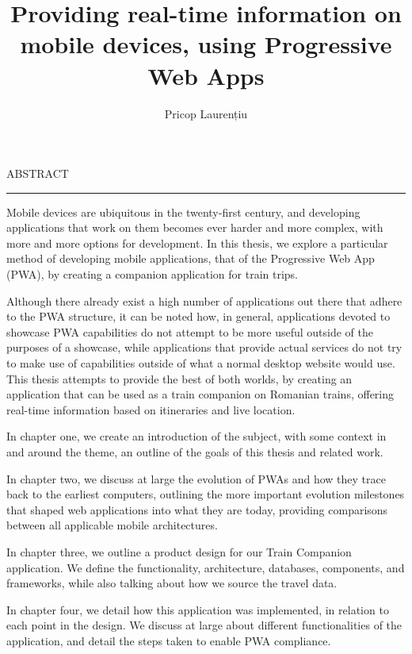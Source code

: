 \documentclass[12pt]{report}
\begin{document}
\title{Providing real-time information on mobile devices, using Progressive Web Apps}
\author{Pricop Laurențiu}

\maketitle

\newpage
\thispagestyle{empty}
\mbox{}
\newpage
{}

\cleardoublepage
ABSTRACT
\vspace{0.5cm}
\hrule
\vspace{0.5cm}

Mobile devices are ubiquitous in the twenty-first century, and developing applications that work on them becomes ever harder and more complex, with more and more options for development. In this thesis, we explore a particular method of developing mobile applications, that of the Progressive Web App (PWA), by creating a companion application for train trips.

Although there already exist a high number of applications out there that adhere to the PWA structure, it can be noted how, in general, applications devoted to showcase PWA capabilities do not attempt to be more useful outside of the purposes of a showcase, while applications that provide actual services do not try to make use of capabilities outside of what a normal desktop website would use. This thesis attempts to provide the best of both worlds, by creating an application that can be used as a train companion on Romanian trains, offering real-time information based on itineraries and live location.

In chapter one, we create an introduction of the subject, with some context in and around the theme, an outline of the goals of this thesis and related work.

In chapter two, we discuss at large the evolution of PWAs and how they trace back to the earliest computers, outlining the more important evolution milestones that shaped web applications into what they are today, providing comparisons between all applicable mobile architectures.

In chapter three, we outline a product design for our Train Companion application. We define the functionality, architecture, databases, components, and frameworks, while also talking about how we source the travel data.

In chapter four, we detail how this application was implemented, in relation to each point in the design. We discuss at large about different functionalities of the application, and detail the steps taken to enable PWA compliance.
\end{document}

